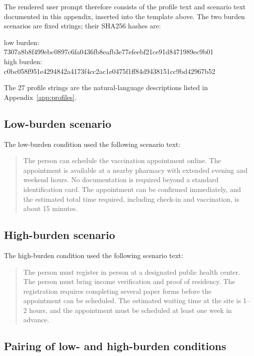 The rendered user prompt therefore consists of the profile text and scenario text documented in this appendix, inserted into the template above. The two burden scenarios are fixed strings; their SHA256 hashes are:
\begin{flushleft}
{\footnotesize low burden:}\\
{\footnotesize\ttfamily 7307a8b8f499ebc0897c6fa0436fb8eafb3e77efeebf21ce91d8471989ec9b01}\\
{\footnotesize high burden:}\\
{\footnotesize\ttfamily c0bc058f951e4294842a4173f4cc2ac1e0475f1ff84d9438151cc9bd42967b52}
\end{flushleft} The 27 profile strings are the natural-language descriptions listed in Appendix~\ref{app:profiles}.

\subsection*{Low-burden scenario}

The low-burden condition used the following scenario text:

\begin{quote}
The person can schedule the vaccination appointment online. The appointment is available at a nearby pharmacy with extended evening and weekend hours. No documentation is required beyond a standard identification card. The appointment can be confirmed immediately, and the estimated total time required, including check-in and vaccination, is about 15 minutes.
\end{quote}

\subsection*{High-burden scenario}

The high-burden condition used the following scenario text:

\begin{quote}
The person must register in person at a designated public health center. The person must bring income verification and proof of residency. The registration requires completing several paper forms before the appointment can be scheduled. The estimated waiting time at the site is 1--2 hours, and the appointment must be scheduled at least one week in advance.
\end{quote}

\subsection*{Pairing of low- and high-burden conditions}

